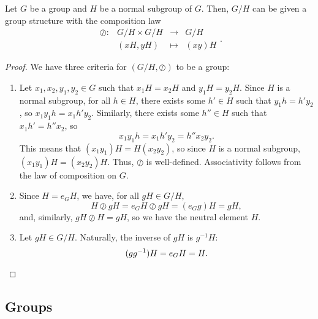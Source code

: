 \begin{thm}\label{thm:cosets_group_structure}
Let $ G $ be a group and $ H $ be a normal subgroup of $ G $. Then, $ G/H $ can be given a group structure with the composition law
\begin{equation*}
    \begin{array}{rccc}
        \oslash: & G/H\times G/H & \to & G/H \\
        & (xH,yH) & \mapsto & (xy)H
    \end{array}.
\end{equation*}
\end{thm}
\begin{proof}
We have three criteria for $ (G/H,\oslash) $ to be a group:
\begin{enumerate}
    \item Let $ x_1,x_2,y_1,y_2\in G $ such that $ x_1H=x_2H $ and $ y_1H=y_2H $. Since $ H $ is a normal subgroup, for all $ h\in H $, there exists some $ h'\in H $ such that $ y_1h=h'y_2 $, so $ x_1y_1h=x_1h'y_2 $. Similarly, there exists some $ h''\in H $ such that $ x_1h'=h''x_2 $, so
    \begin{equation*}
        x_1y_1h=x_1h'y_2=h''x_2y_2.
    \end{equation*}
    This means that $ (x_1y_1)H=H(x_2y_2) $, so since $ H $ is a normal subgroup, $ (x_1y_1)H=(x_2y_2)H $. Thus, $ \oslash $ is well-defined. Associativity follows from the law of composition on $ G $.

    \item Since $ H=e_GH $, we have, for all $ gH\in G/H $,
    \begin{equation*}
        H\oslash gH=e_GH\oslash gH=(e_Gg)H=gH,
    \end{equation*}
    and, similarly, $ gH\oslash H=gH $, so we have the neutral element $ H $.

    \item Let $ gH\in G/H $. Naturally, the inverse of $ gH $ is $ g^{-1}H $:
    \begin{equation*}
        (gg^{-1})H=e_GH=H.\qedhere
    \end{equation*}
\end{enumerate}
\end{proof}


\subsection*{Groups}

